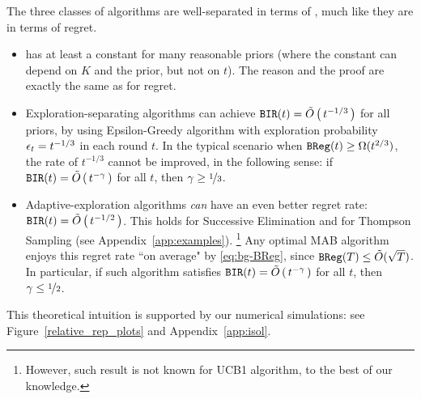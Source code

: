 The three classes of algorithms are well-separated in terms of \BIR, much like they are in terms of regret. 
\begin{itemize}
\item \DynGreedy has at least a constant \BIR for many reasonable priors (where the constant can depend on $K$ and the prior, but not on $t$). The reason and the proof are exactly the same as for regret.

\item Exploration-separating algorithms can achieve
    $\mathtt{BIR}(t) = \tilde{O}\left(\,t^{-1/3}\,\right)$
for all priors, \eg by using Epsilon-Greedy algorithm with exploration probability $\epsilon_t = t^{-1/3}$ in each round $t$.
In the typical scenario when
 $\mathtt{BReg}(t)\geq \Omega(t^{2/3})$,
the \BIR rate of $t^{-1/3}$  cannot be improved, in the following sense:
if
    $\mathtt{BIR}(t) = \tilde{O}\left(\,t^{-\gamma}\,\right)$
for all $t$, then $\gamma\geq \nicefrac{1}{3}$. 

\item Adaptive-exploration algorithms \emph{can} have an even better regret rate: $\mathtt{BIR}(t) = \tilde{O}\left(\, t^{-1/2} \,\right) $. This holds for Successive Elimination \citep{EvenDar-icml06} and for Thompson Sampling (see Appendix~\ref{app:examples}).%
    \footnote{However, such result is not known for UCB1 algorithm, to the best of our knowledge.}
    Any optimal MAB algorithm enjoys this regret rate ``on average" by \eqref{eq:bg-BReg}, since 
        $\mathtt{BReg}(T)\leq \tilde{O}(\sqrt{T})$.
    In particular, if such algorithm satisfies
        $\mathtt{BIR}(t) = \tilde{O}\left(\,t^{-\gamma}\,\right)$
    for all $t$, then $\gamma \leq \nicefrac{1}{2}$. 
    
\end{itemize}

This theoretical intuition is supported by our numerical simulations: see 
Figure~\ref{relative_rep_plots} and Appendix~\ref{app:isol}.


